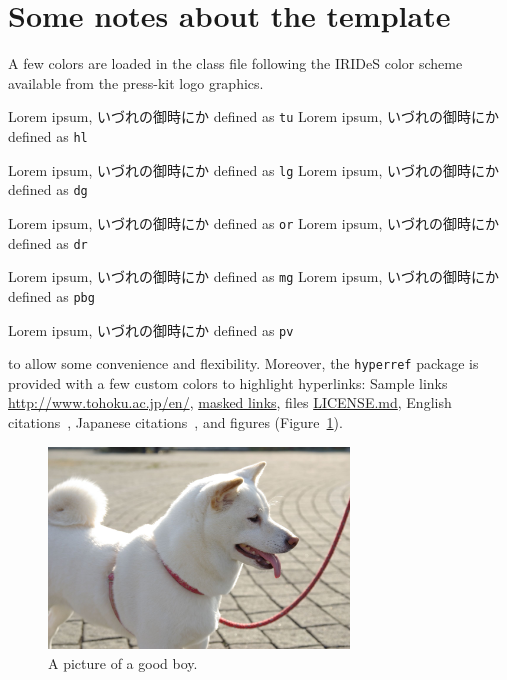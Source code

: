 \documentclass[a4paper,11pt]{TUmemorandum}
\begin{document}
\maketitle
\pagestyle{plain}
\section*{Some notes about the template}
%
A few colors are loaded in the class file following the IRIDeS color scheme available from the press-kit logo graphics.\par
\noindent \textcolor{tu}{Lorem ipsum, いづれの御時にか} defined as \verb+tu+
\textcolor{hl}{Lorem ipsum, いづれの御時にか} defined as \verb+hl+ \par
\noindent \textcolor{lg}{Lorem ipsum, いづれの御時にか} defined as \verb+lg+
\textcolor{dg}{Lorem ipsum, いづれの御時にか} defined as \verb+dg+ \par
\noindent \textcolor{or}{Lorem ipsum, いづれの御時にか} defined as \verb+or+
\textcolor{dr}{Lorem ipsum, いづれの御時にか} defined as \verb+dr+ \par
\noindent \textcolor{mg}{Lorem ipsum, いづれの御時にか} defined as \verb+mg+
\textcolor{pbg}{Lorem ipsum, いづれの御時にか} defined as \verb+pbg+ \par
\noindent \textcolor{pv}{Lorem ipsum, いづれの御時にか} defined as \verb+pv+ \par
\noindent to allow some convenience and flexibility. Moreover, the \verb+hyperref+ package is provided with a few custom colors to highlight hyperlinks:
Sample links \url{http://www.tohoku.ac.jp/en/}, \href{https://www.tohoku.ac.jp/japanese/}{masked links}, files \href{run:./LICENSE.md}{LICENSE.md}, English citations~\cite{Koshimura2009a}, Japanese citations~\cite{里美2013}, and figures (Figure~\ref{fig:doggo}).
\begin{figure}[h]
\centering
\includegraphics[width=8cm]{shiba.jpg}
\caption{A picture of a good boy.}\label{fig:doggo}
\end{figure}
%
\end{document}

